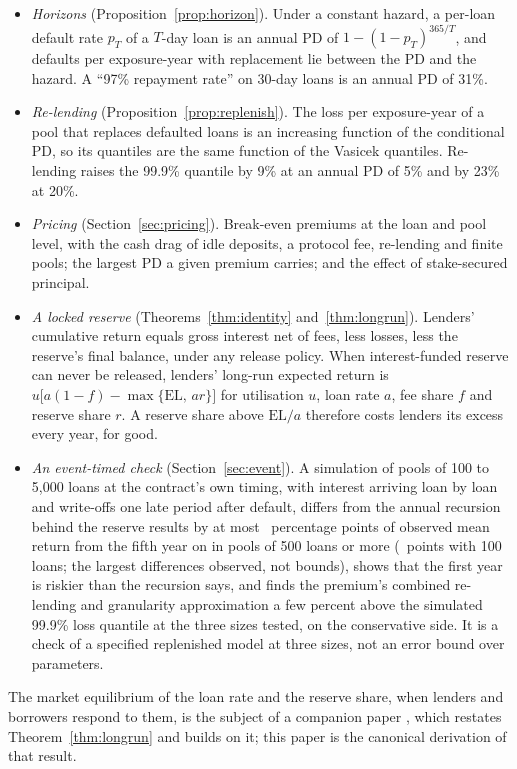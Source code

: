 \documentclass[11pt]{article}
\theoremstyle{plain}
\theoremstyle{definition}
\newcommand{\EL}{\mathrm{EL}}
\begin{document}
\begin{itemize}
\item \emph{Horizons} (Proposition~\ref{prop:horizon}). Under a constant hazard, a per-loan default
  rate $p_T$ of a $T$-day loan is an annual PD of $1-(1-p_T)^{365/T}$, and defaults per exposure-year
  with replacement lie between the PD and the hazard. A ``97\% repayment rate'' on 30-day loans is an
  annual PD of 31\%.
\item \emph{Re-lending} (Proposition~\ref{prop:replenish}). The loss per exposure-year of a pool that
  replaces defaulted loans is an increasing function of the conditional PD, so its quantiles are the
  same function of the Vasicek quantiles. Re-lending raises the 99.9\% quantile by 9\% at an annual
  PD of 5\% and by 23\% at 20\%.
\item \emph{Pricing} (Section~\ref{sec:pricing}). Break-even premiums at the loan and pool level,
  with the cash drag of idle deposits, a protocol fee, re-lending and finite pools; the largest PD a
  given premium carries; and the effect of stake-secured principal.
\item \emph{A locked reserve} (Theorems~\ref{thm:identity} and~\ref{thm:longrun}). Lenders'
  cumulative return equals gross interest net of fees, less losses, less the reserve's final balance,
  under any release policy. When interest-funded reserve can never be released, lenders' long-run
  expected return is $u\bigl[a(1-f)-\max\{\EL,\,ar\}\bigr]$ for utilisation $u$, loan rate $a$, fee
  share $f$ and reserve share $r$. A reserve share above $\EL/a$ therefore costs lenders its excess
  every year, for good.
\item \emph{An event-timed check} (Section~\ref{sec:event}). A simulation of pools of 100 to 5,000
  loans at the contract's own timing, with interest arriving loan by loan and write-offs one late
  period after default, differs from the annual recursion behind the reserve results by at most
  \EventDiffMaxFiveHundredPlus\ percentage points of observed mean return from the fifth year on in
  pools of 500 loans or more (\EventDiffMaxHundred\ points with 100 loans; the largest differences
  observed, not bounds), shows that the first year is riskier than the recursion says, and finds
  the premium's combined re-lending and granularity approximation
  a few percent above the simulated 99.9\% loss quantile at the three sizes tested, on the
  conservative side. It is a check of a specified replenished model at three sizes, not an error
  bound over parameters.
\end{itemize}
The market equilibrium of the loan rate and the reserve share, when lenders and borrowers respond to
them, is the subject of a companion paper \citep{lendingequilibrium2026}, which restates
Theorem~\ref{thm:longrun} and builds on it; this paper is the canonical derivation of that result.
\end{document}
